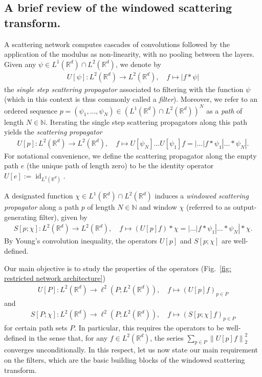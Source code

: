 \documentclass[11pt]{amsart}
\newcommand{\R}{{\mathbb{R}}}
\newcommand{\N}{\mathbb{N}}
\newcommand{\norm}[1]{\ensuremath{\left\lVert\text{}#1\text{}\right\rVert}}
\DeclareMathOperator{\id}{id}
\newenvironment{proof sketch} {\textit{Proof sketch.}}{}
\begin{document}
  \subsection{A brief review of the windowed scattering transform.}\label{sec: brief review}
  
  A scattering network computes cascades of convolutions followed by the application of the modulus as non-linearity, with no pooling between the layers. Given any $\psi \in L^1(\R^d)\cap L^2(\R^d)$, we denote by 
  \begin{align}\label{def: single step scattering propagator}
    U[\psi]:L^2(\R^d)\to L^2(\R^d), \quad f \mapsto |f*\psi|
  \end{align}
  the \textit{single step scattering propagator} associated to filtering with the function $\psi$ (which in this context is thus commonly called a \textit{filter}). Moreover, we refer to an ordered sequence $p=(\psi_1,\ldots,\psi_N)\in (L^1(\R^d)\cap L^2(\R^d))^N$ 
  as a \textit{path} of length $N \in \N$. Iterating the single step scattering propagators along this path yields the \textit{scattering propagator}
  \begin{align}\label{def: scattering propagator}
    U[p]:L^2(\R^d)\to L^2(\R^d), \quad f \mapsto U[\psi_N]\ldots U[\psi_1]f = |\ldots|f*\psi_1|\ldots*\psi_N|.
  \end{align}
  For notational convenience, we define the scattering propagator along the empty path $e$ (the unique path of length zero) to be the identity operator $U[e]:=\id_{L^2(\R^d)}$. 
  
  A designated function $\chi \in L^1(\R^d)\cap L^2(\R^d)$ induces a \textit{windowed scattering propagator} along a path $p$ 
  of length $N \in \N$ and window $\chi$ (referred to as output-generating filter), given by 
  \begin{align}\label{def: windowed scattering propagator}
    S[p;\chi]:L^2(\R^d)\to L^2(\R^d), \quad f \mapsto (U[p]f)*\chi = |\ldots|f*\psi_1|\ldots*\psi_N|*\chi.
  \end{align}
  By Young's convolution inequality, the operators $U[p]$ and $S[p;\chi]$ are well-defined.  
   
  Our main objective is to study the properties of the operators (Fig.~\ref{fig: restricted network architecture})
  \begin{align}\label{def: collection of scattering propagators}
    U[P]: L^2(\R^d) \to \ell^2(P;L^2(\R^d)), \quad f \mapsto \left(U[p]f\right)_{p \in P}
  \end{align}
  and
  \begin{align}\label{def: collection of windowed scattering propagators}
    S[P;\chi]: L^2(\R^d) \to \ell^2(P;L^2(\R^d)), \quad f \mapsto \left(S[p;\chi]f\right)_{p \in P}
  \end{align}
  for certain path sets $P$. 
  In particular, this requires the operators to be well-defined in the sense that, for any $f \in L^2(\R^d)$, the series $\sum_{p \in P} \norm{U[p]f}_2^2$ converges unconditionally. In this respect, let us now state our main requirement on the filters, which are the basic building blocks of the windowed scattering transform. 
  
\end{document}
